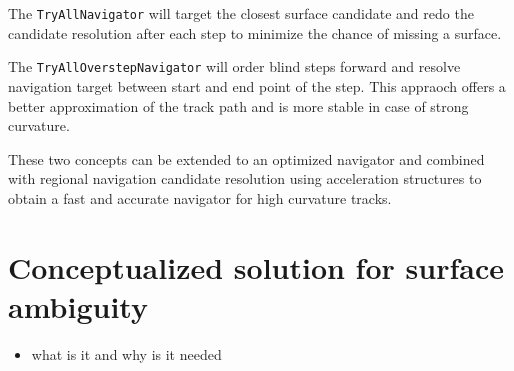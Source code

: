 The \texttt{TryAllNavigator} will target the closest surface candidate and redo the candidate resolution after each step to minimize the chance of missing a surface.

The \texttt{TryAllOverstepNavigator} will order blind steps forward and resolve navigation target between start and end point of the step. This appraoch offers a better approximation of the track path and is more stable in case of strong curvature.

These two concepts can be extended to an optimized navigator and combined with regional navigation candidate resolution using acceleration structures to obtain a fast and accurate navigator for high curvature tracks.

\section{Conceptualized solution for surface ambiguity}

\begin{itemize}
    \color{red}
    \item what is it and why is it needed
\end{itemize}

